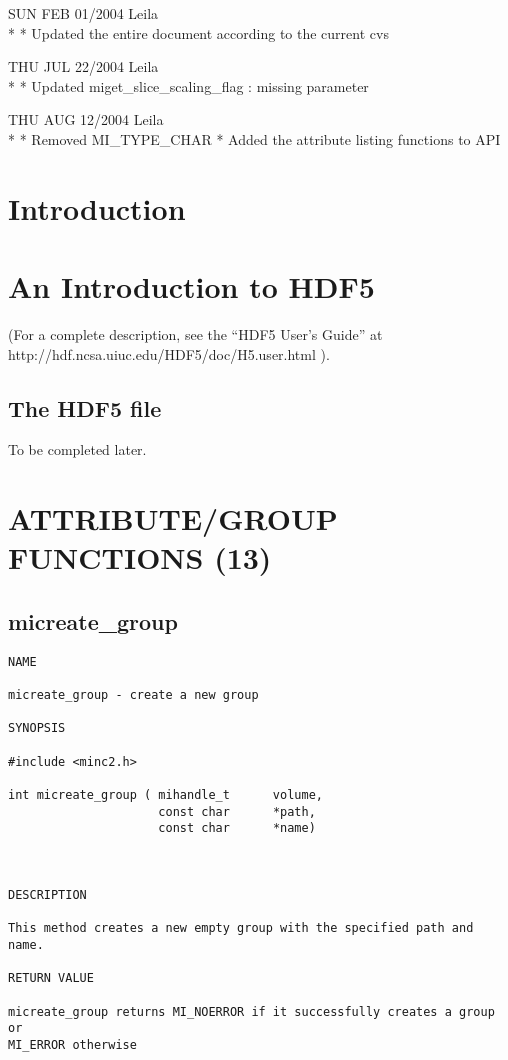 \documentclass{article}
\begin{document}
SUN FEB 01/2004 Leila\\*
* Updated the entire document according to the current cvs

THU JUL 22/2004 Leila\\*
* Updated miget_slice_scaling_flag : missing parameter

THU AUG 12/2004 Leila\\*
* Removed MI_TYPE_CHAR 
* Added the attribute listing functions to API

\section{Introduction}



\section{An Introduction to HDF5}

(For a complete description, see the ``HDF5 User's Guide''
at http://hdf.ncsa.uiuc.edu/HDF5/doc/H5.user.html ).

\subsection{The HDF5 file}

To be completed later. 

\section{ATTRIBUTE/GROUP FUNCTIONS (13)}
\subsection{micreate\_group}

\begin{verbatim}
NAME 

micreate_group - create a new group

SYNOPSIS

#include <minc2.h>

int micreate_group ( mihandle_t      volume,
                     const char      *path,
                     const char      *name)
                    
                       
                                
DESCRIPTION

This method creates a new empty group with the specified path and name.

RETURN VALUE

micreate_group returns MI_NOERROR if it successfully creates a group or 
MI_ERROR otherwise

\end{verbatim}
\end{document}
